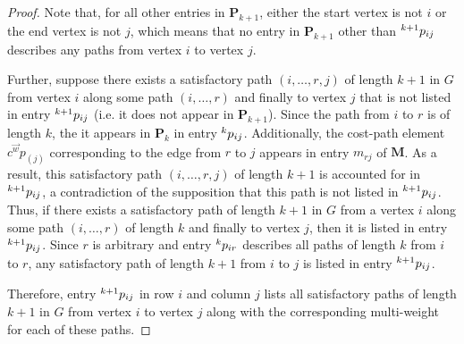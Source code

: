 \documentclass[12pt]{amsart}
\theoremstyle{definition}
\theoremstyle{remark}
\numberwithin{equation}{section}
\begin{document}
\begin{proof}
Note that, for all other entries in $\mathbf{P}_{k+1}$, either the start vertex is not $i$ or the end vertex is not $j$, which means that no entry in $\mathbf{P}_{k+1}$ other than $\prescript{k+1}{}{p_{ij}}$ describes any paths from vertex $i$ to vertex $j$.

Further, suppose there exists a satisfactory path $(i, \ldots, r, j)$ of length $k+1$ in $G$ from vertex $i$ along some path $(i, \ldots, r)$ and finally to vertex $j$ that is not listed in entry $\prescript{k+1}{}{p_{ij}}$ (i.e. it does not appear in $\mathbf{P}_{k+1}$). Since the path from $i$ to $r$ is of length $k$, the it appears in $\mathbf{P}_k$ in entry $\prescript{k}{}{p_{ij}} $. Additionally, the cost-path element $c^{\vec{w}} p_{(j)}$ corresponding to the edge from $r$ to $j$ appears in entry $m_{rj}$ of $\mathbf{M}$. As a result, this satisfactory path $(i, \ldots, r, j)$ of length $k+1$ is accounted for in $\prescript{k+1}{}{p_{ij}} $, a contradiction of the supposition that this path is not listed in $\prescript{k+1}{}{p_{ij}}$. Thus, if there exists a satisfactory path of length $k+1$ in $G$ from a vertex $i$ along some path $(i, \ldots, r)$ of length $k$ and finally to vertex $j$, then it is listed in entry $\prescript{k+1}{}{p_{ij}}$. Since $r$ is arbitrary and entry $\prescript{k}{}{p_{ir}}$ describes all paths of length $k$ from $i$ to $r$, any satisfactory path of length $k+1$ from $i$ to $j$ is listed in entry $\prescript{k+1}{}{p_{ij}}$.

Therefore, entry $\prescript{k+1}{}{p_{ij}}$ in row $i$ and column $j$ lists all satisfactory paths of length $k+1$ in $G$ from vertex $i$ to vertex $j$ along with the corresponding multi-weight for each of these paths.
\end{proof}

\newpage
\end{document}
